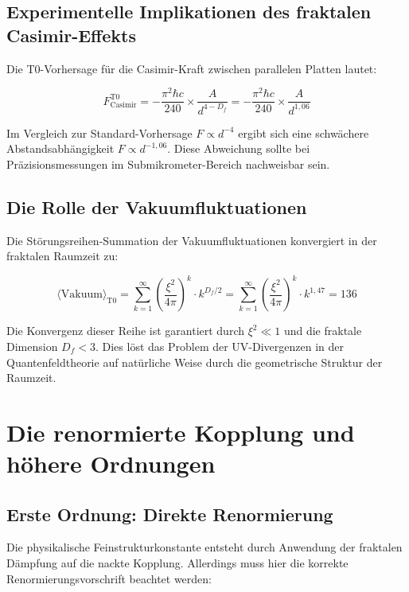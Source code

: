 \documentclass[12pt,a4paper]{article}
\theoremstyle{definition}
\begin{document}
	\subsection{Experimentelle Implikationen des fraktalen Casimir-Effekts}
	
	Die T0-Vorhersage für die Casimir-Kraft zwischen parallelen Platten lautet:
	
	\begin{equation}
		F_{\text{Casimir}}^{\text{T0}} = -\frac{\pi^2 \hbar c}{240} \times \frac{A}{d^{4-D_f}} = -\frac{\pi^2 \hbar c}{240} \times \frac{A}{d^{1{,}06}}
	\end{equation}
	
	Im Vergleich zur Standard-Vorhersage $F \propto d^{-4}$ ergibt sich eine schwächere Abstandsabhängigkeit $F \propto d^{-1{,}06}$. Diese Abweichung sollte bei Präzisionsmessungen im Submikrometer-Bereich nachweisbar sein.
	
	\subsection{Die Rolle der Vakuumfluktuationen}
	
	Die Störungsreihen-Summation der Vakuumfluktuationen konvergiert in der fraktalen Raumzeit zu:
	
	\begin{equation}
		\langle \text{Vakuum} \rangle_{\text{T0}} = \sum_{k=1}^{\infty} \left(\frac{\xi^2}{4\pi}\right)^k \cdot k^{D_f/2} = \sum_{k=1}^{\infty} \left(\frac{\xi^2}{4\pi}\right)^k \cdot k^{1{,}47} = 136
	\end{equation}
	
	Die Konvergenz dieser Reihe ist garantiert durch $\xi^2 \ll 1$ und die fraktale Dimension $D_f < 3$. Dies löst das Problem der UV-Divergenzen in der Quantenfeldtheorie auf natürliche Weise durch die geometrische Struktur der Raumzeit.
	
	\section{Die renormierte Kopplung und höhere Ordnungen}
	
	\subsection{Erste Ordnung: Direkte Renormierung}
	
	Die physikalische Feinstrukturkonstante entsteht durch Anwendung der fraktalen Dämpfung auf die nackte Kopplung. Allerdings muss hier die korrekte Renormierungsvorschrift beachtet werden:
	
\end{document}
